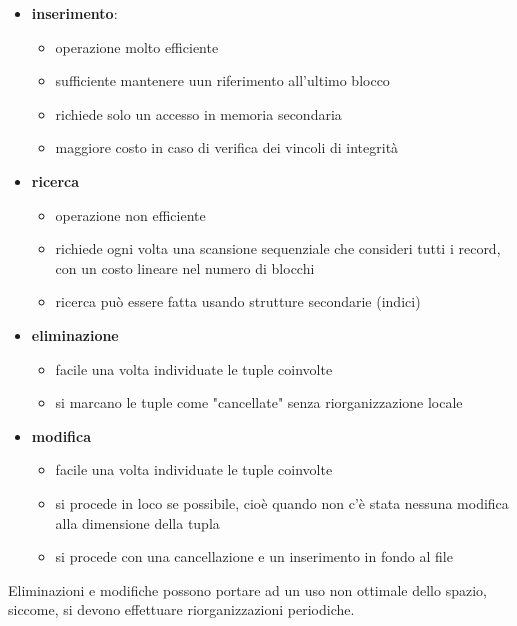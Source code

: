 \begin{itemize}[label=$\Rightarrow$, itemsep=\smallskipamount]
  \item \textbf{inserimento}:
  \begin{itemize}[label=$\diamond$, itemsep=\smallskipamount]
    \item operazione molto efficiente
    \item sufficiente mantenere uun riferimento all'ultimo blocco
    \item richiede solo un accesso in memoria secondaria
    \item maggiore costo in caso di verifica dei vincoli di integrità
  \end{itemize}
  \item \textbf{ricerca}
  \begin{itemize}[label=$\diamond$, itemsep=\smallskipamount]
    \item operazione non efficiente
    \item richiede ogni volta una scansione sequenziale che consideri tutti i record, con un costo lineare nel numero di blocchi
    \item ricerca può essere fatta usando strutture secondarie (indici)
  \end{itemize}
  \item \textbf{eliminazione}
  \begin{itemize}[label=$\diamond$, itemsep=\smallskipamount]
    \item  facile una volta individuate le tuple coinvolte
    \item si marcano le tuple come "cancellate" senza riorganizzazione locale
  \end{itemize}
  \item \textbf{modifica}
  \begin{itemize}[label=$\diamond$, itemsep=\smallskipamount]
    \item  facile una volta individuate le tuple coinvolte
    \item si procede in loco se possibile, cioè quando non c’è stata nessuna modifica alla dimensione della tupla
    \item si procede con una cancellazione e un inserimento in fondo al file
  \end{itemize}
\end{itemize}

Eliminazioni e modifiche possono portare ad un uso non ottimale dello spazio, siccome, si devono effettuare riorganizzazioni periodiche.

